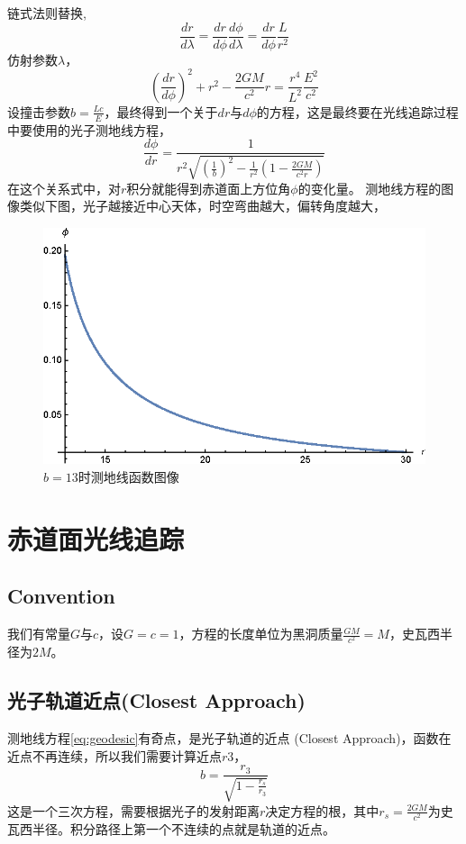 链式法则替换,
\begin{equation}
    \frac{dr}{d\lambda}=\frac{dr}{d\phi}\frac{d\phi}{d\lambda}=\frac{dr}{d\phi}\frac{L}{r^{2}}
\end{equation}
仿射参数$\lambda$，
\begin{equation}
    \left(\frac{dr}{d\phi}\right)^{2}+r^{2}-\frac{2GM}{c^{2}}r=\frac{r^{4}}{L^{2}}\frac{E^{2}}{c^{2}}
\end{equation}
设撞击参数$b=\frac{Lc}{E}$，最终得到一个关于$dr$与$d\phi$的方程，这是最终要在光线追踪过程中要使用的光子测地线方程，
\begin{equation}
    \frac{d\phi}{dr}=\frac{1}{r^{2}\sqrt{\left(\frac{1}{b}\right)^{2}-\frac{1}{r^{2}}\left(1-\frac{2GM}{c^{2}r}\right)}}\label{eq:geodesic}
\end{equation}
在这个关系式中，对$r$积分就能得到赤道面上方位角$\phi$的变化量。
测地线方程的图像类似下图，光子越接近中心天体，时空弯曲越大，偏转角度越大，
\begin{figure}[htbp]
    \centering
    \includegraphics{images/geodesic.eps}
    \caption{$b=13$时测地线函数图像}\label{fig:geodesic} %
\end{figure}

\section{赤道面光线追踪}
\subsection{Convention}
我们有常量$G$与$c$，设$G=c=1$，方程的长度单位为黑洞质量$\frac{GM}{c^2}=M$，史瓦西半径为$2M$。

\subsection{光子轨道近点(Closest Approach)}
测地线方程\eqref{eq:geodesic}有奇点，是光子轨道的近点 (Closest Approach)，函数在近点不再连续，所以我们需要计算近点$r3$，
\begin{equation}
    b=\frac{r_3}{\sqrt{1-\frac{r_s}{r_3}}}\label{eq:r3}
\end{equation}
这是一个三次方程，需要根据光子的发射距离$r$决定方程的根，其中$r_s=\frac{2GM}{c^2}$为史瓦西半径。积分路径上第一个不连续的点就是轨道的近点。


